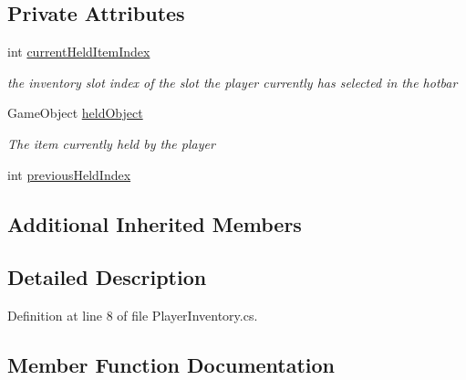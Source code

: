 \subsection*{Private Attributes}
\begin{DoxyCompactItemize}
\item 
int \hyperlink{class_bee_game_1_1_inventory_1_1_player_inventory_ac2978979c5c8e45fccc7d3a10882ea1b}{current\+Held\+Item\+Index}
\begin{DoxyCompactList}\small\item\em the inventory slot index of the slot the player currently has selected in the hotbar \end{DoxyCompactList}\item 
Game\+Object \hyperlink{class_bee_game_1_1_inventory_1_1_player_inventory_ae30e4d599863e910244ff52ba53a1dfb}{held\+Object}
\begin{DoxyCompactList}\small\item\em The item currently held by the player \end{DoxyCompactList}\item 
int \hyperlink{class_bee_game_1_1_inventory_1_1_player_inventory_a2e16150bcef69b49276c1617d4f2c030}{previous\+Held\+Index}
\end{DoxyCompactItemize}
\subsection*{Additional Inherited Members}


\subsection{Detailed Description}


Definition at line 8 of file Player\+Inventory.\+cs.



\subsection{Member Function Documentation}
\mbox{\label{class_bee_game_1_1_inventory_1_1_player_inventory_a30f01639eaee55b92c8feb4a5ab2e5df}} 
